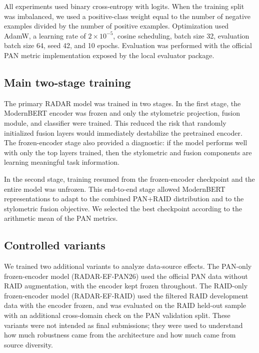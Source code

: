 \documentclass[]{ceurart}
\begin{document}
All experiments used binary cross-entropy with logits. When the training split was imbalanced, we used a positive-class weight equal to the number of negative examples divided by the number of positive examples. Optimization used AdamW, a learning rate of $2 \times 10^{-5}$, cosine scheduling, batch size 32, evaluation batch size 64, seed 42, and 10 epochs. Evaluation was performed with the official PAN metric implementation exposed by the local evaluator package.
 
\subsection{Main two-stage training}

The primary RADAR model was trained in two stages. In the first stage, the ModernBERT encoder was frozen and only the stylometric projection, fusion module, and classifier were trained. This reduced the risk that randomly initialized fusion layers would immediately destabilize the pretrained encoder. The frozen-encoder stage also provided a diagnostic: if the model performs well with only the top layers trained, then the stylometric and fusion components are learning meaningful task information.

In the second stage, training resumed from the frozen-encoder checkpoint and the entire model was unfrozen. This end-to-end stage allowed ModernBERT representations to adapt to the combined PAN+RAID distribution and to the stylometric fusion objective. We selected the best checkpoint according to the arithmetic mean of the PAN metrics.

\subsection{Controlled variants}

We trained two additional variants to analyze data-source effects. The PAN-only frozen-encoder model (RADAR-EF-PAN26) used the official PAN data without RAID augmentation, with the encoder kept frozen throughout. The RAID-only frozen-encoder model (RADAR-EF-RAID) used the filtered RAID development data with the encoder frozen, and was evaluated on the RAID held-out sample with an additional cross-domain check on the PAN validation split. These variants were not intended as final submissions; they were used to understand how much robustness came from the architecture and how much came from source diversity.
\end{document}
